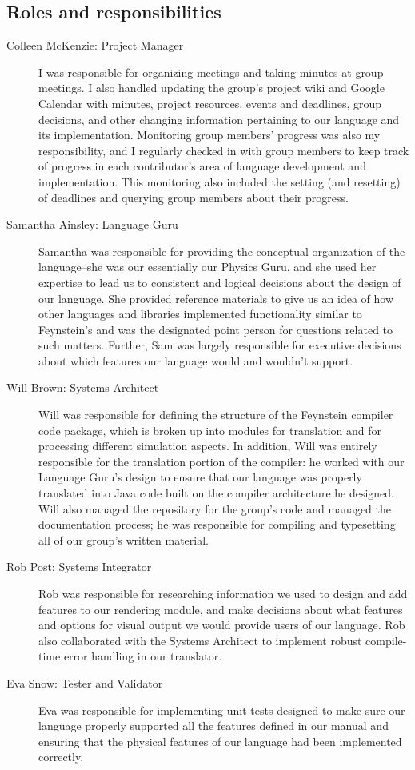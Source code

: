 \subsection{Roles and responsibilities}
\begin{description}
\item[Colleen McKenzie: Project Manager] I was responsible for
  organizing meetings and taking minutes at group meetings. I also
  handled updating the group’s project wiki and Google Calendar with
  minutes, project resources, events and deadlines, group decisions,
  and other changing information pertaining to our language and its
  implementation. Monitoring group members’ progress was also my
  responsibility, and I regularly checked in with group members to
  keep track of progress in each contributor’s area of language
  development and implementation. This monitoring also included the
  setting (and resetting) of deadlines and querying group members
  about their progress.

\item[Samantha Ainsley: Language Guru] Samantha was responsible for
  providing the conceptual organization of the language--she was our
  essentially our Physics Guru, and she used her expertise to lead us
  to consistent and logical decisions about the design of our
  language. She provided reference materials to give us an idea of how
  other languages and libraries implemented functionality similar to
  Feynstein’s and was the designated point person for questions
  related to such matters. Further, Sam was largely responsible for
  executive decisions about which features our language would and
  wouldn’t support.

\item[Will Brown: Systems Architect] Will was responsible for defining
  the structure of the Feynstein compiler code package, which is
  broken up into modules for translation and for processing different
  simulation aspects. In addition, Will was entirely responsible for
  the translation portion of the compiler: he worked with our Language
  Guru’s design to ensure that our language was properly translated
  into Java code built on the compiler architecture he designed. Will
  also managed the repository for the group’s code and managed the
  documentation process; he was responsible for compiling and
  typesetting all of our group's written material.

\item[Rob Post: Systems Integrator] Rob was responsible for
  researching information we used to design and add features to our
  rendering module, and make decisions about what features and options
  for visual output we would provide users of our language. Rob also
  collaborated with the Systems Architect to implement robust
  compile-time error handling in our translator.

\item[Eva Snow: Tester and Validator] Eva was responsible for
  implementing unit tests designed to make sure our language properly
  supported all the features defined in our manual and ensuring that
  the physical features of our language had been implemented
  correctly.
\end{description}

